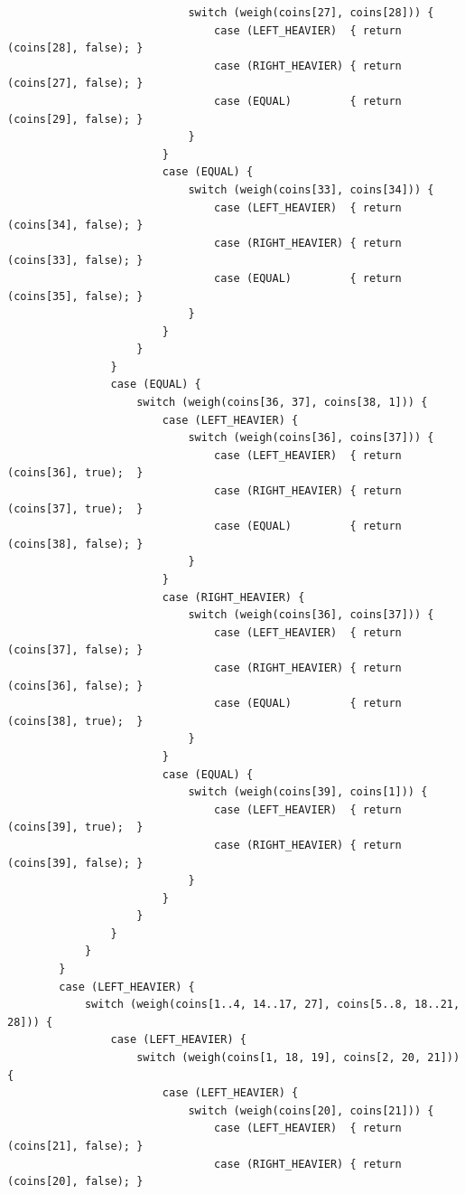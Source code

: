 \documentclass[answers]{exam}
\begin{document}
\begin{questions}
\begin{parts}
\begin{solution}
\begin{small}
\begin{verbatim}
                            switch (weigh(coins[27], coins[28])) {
                                case (LEFT_HEAVIER)  { return (coins[28], false); }
                                case (RIGHT_HEAVIER) { return (coins[27], false); }
                                case (EQUAL)         { return (coins[29], false); }
                            }
                        }
                        case (EQUAL) {
                            switch (weigh(coins[33], coins[34])) {
                                case (LEFT_HEAVIER)  { return (coins[34], false); }
                                case (RIGHT_HEAVIER) { return (coins[33], false); }
                                case (EQUAL)         { return (coins[35], false); }
                            }
                        }
                    }
                }
                case (EQUAL) {
                    switch (weigh(coins[36, 37], coins[38, 1])) {
                        case (LEFT_HEAVIER) {
                            switch (weigh(coins[36], coins[37])) {
                                case (LEFT_HEAVIER)  { return (coins[36], true);  }
                                case (RIGHT_HEAVIER) { return (coins[37], true);  }
                                case (EQUAL)         { return (coins[38], false); }
                            }
                        }
                        case (RIGHT_HEAVIER) {
                            switch (weigh(coins[36], coins[37])) {
                                case (LEFT_HEAVIER)  { return (coins[37], false); }
                                case (RIGHT_HEAVIER) { return (coins[36], false); }
                                case (EQUAL)         { return (coins[38], true);  }
                            }
                        }
                        case (EQUAL) {
                            switch (weigh(coins[39], coins[1])) {
                                case (LEFT_HEAVIER)  { return (coins[39], true);  }
                                case (RIGHT_HEAVIER) { return (coins[39], false); }
                            }
                        }
                    }
                }
            }
        }
        case (LEFT_HEAVIER) {
            switch (weigh(coins[1..4, 14..17, 27], coins[5..8, 18..21, 28])) {
                case (LEFT_HEAVIER) {
                    switch (weigh(coins[1, 18, 19], coins[2, 20, 21])) {
                        case (LEFT_HEAVIER) {
                            switch (weigh(coins[20], coins[21])) {
                                case (LEFT_HEAVIER)  { return (coins[21], false); }
                                case (RIGHT_HEAVIER) { return (coins[20], false); }

\end{verbatim}
\end{small}
\end{solution}
\end{parts}
\end{questions}
\end{document}
